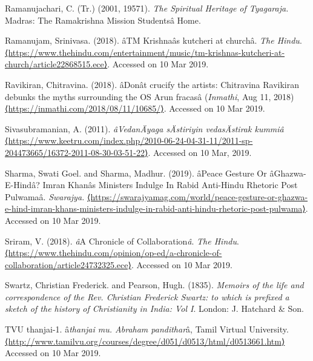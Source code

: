 \begin{thebibliography}{99}
  Ramanujachari, C. (Tr.) (2001, 19571). \textit{The Spiritual Heritage of Tyagaraja. }Madras: The Ramakrishna Mission Studentsâ Home.

  Ramanujam, Srinivasa. (2018). âTM Krishnaâs kutcheri at churchâ. \textit{The Hindu}. \url{⟨https://www.thehindu.com/entertainment/music/tm-krishnas-kutcheri-at-church/article22868515.ece⟩}. Accessed on 10 Mar 2019.

  Ravikiran, Chitravina. (2018). âDonât crucify the artists: Chitravina Ravikiran debunks the myths surrounding the OS Arun fracasâ (\textit{Inmathi}, Aug 11, 2018) \url{⟨https://inmathi.com/2018/08/11/10685/⟩}. Accessed on 10 Mar 2019.

  Sivasubramanian, A. (2011). \textit{âVedanÄyaga sÄstiriyin vedasÄstirak kummiâ} \url{⟨https://www.keetru.com/index.php/2010-06-24-04-31-11/2011-sp-204473665/16372-2011-08-30-03-51-22⟩}. Accessed on 10 Mar, 2019.

  Sharma, Swati Goel. and Sharma, Madhur. (2019). âPeace Gesture Or âGhazwa-E-Hindâ? Imran Khanâs Ministers Indulge In Rabid Anti-Hindu Rhetoric Post Pulwamaâ. \textit{Swarajya.} \url{⟨https://swarajyamag.com/world/peace-gesture-or-ghazwa-e-hind-imran-khans-ministers-indulge-in-rabid-anti-hindu-rhetoric-post-pulwama⟩}. Accessed on 10 Mar 2019.

  Sriram, V. (2018). \textit{â}A Chronicle of Collaboration\textit{â}. \textit{The Hindu}. \url{⟨https://www.thehindu.com/opinion/op-ed/a-chronicle-of-collaboration/article24732325.ece⟩}. Accessed on 10 Mar 2019.

  Swartz, Christian Frederick. and Pearson, Hugh. (1835). \textit{Memoirs of the life and correspondence of the Rev. Christian Frederick Swartz: to which is prefixed a sketch of the history of Christianity in India: Vol I}. London: J. Hatchard \& Son.

  TVU thanjai-1. â\textit{thanjai mu. Abraham pandithar}â, Tamil Virtual University. \url{⟨http://www.tamilvu.org/courses/degree/d051/d0513/html/d0513661.htm⟩} Accessed on 10 Mar 2019.

 \end{thebibliography}

\theendnotes

